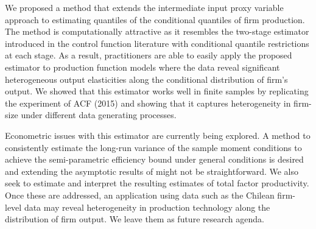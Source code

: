 \documentclass[11pt]{article}
\begin{document}
We proposed a method that extends the intermediate input proxy variable approach to estimating quantiles of the conditional quantiles of firm production. The method is computationally attractive as it resembles the two-stage estimator introduced in the control function literature with conditional quantile restrictions at each stage. As a result, practitioners are able to easily apply the proposed estimator to production function models where the data reveal significant heterogeneous output elasticities along the conditional distribution of firm's output. We showed that this estimator works well in finite samples by replicating the experiment of ACF (2015) and showing that it captures heterogeneity in firm-size under different data generating processes.  

Econometric issues with this estimator are currently being explored. A method to consistently estimate the long-run variance of the sample moment conditions to achieve the semi-parametric efficiency bound under general conditions is desired and extending the asymptotic results of \cite*{qgmm} might not be straightforward. We also seek to estimate and interpret the resulting estimates of total factor productivity. Once these are addressed, an application using data such as the Chilean firm-level data may reveal heterogeneity in production technology along the distribution of firm output. 
We leave them as future research agenda.


\pagebreak
\newpage











\end{document}

